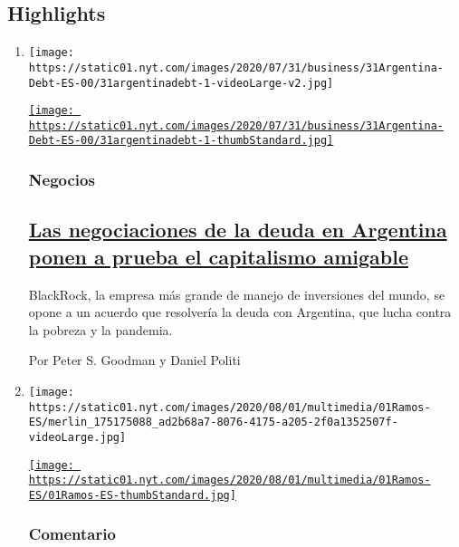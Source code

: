 \hypertarget{highlights}{%
\subsection{Highlights}\label{highlights}}

\begin{enumerate}
\def\labelenumi{\arabic{enumi}.}
\item
  \texttt{[image: https://static01.nyt.com/images/2020/07/31/business/31Argentina-Debt-ES-00/31argentinadebt-1-videoLarge-v2.jpg]}

  \href{/es/2020/07/31/espanol/negocios/argentina-deuda.html}{\texttt{[image: https://static01.nyt.com/images/2020/07/31/business/31Argentina-Debt-ES-00/31argentinadebt-1-thumbStandard.jpg]}}

  \hypertarget{negocios}{%
  \subsubsection{Negocios}\label{negocios}}

  \hypertarget{las-negociaciones-de-la-deuda-en-argentina-ponen-a-prueba-el-capitalismo-amigable}{%
  \subsection{\texorpdfstring{\href{/es/2020/07/31/espanol/negocios/argentina-deuda.html}{Las
  negociaciones de la deuda en Argentina ponen a prueba el capitalismo
  amigable}}{Las negociaciones de la deuda en Argentina ponen a prueba el capitalismo amigable}}\label{las-negociaciones-de-la-deuda-en-argentina-ponen-a-prueba-el-capitalismo-amigable}}

  BlackRock, la empresa más grande de manejo de inversiones del mundo,
  se opone a un acuerdo que resolvería la deuda con Argentina, que lucha
  contra la pobreza y la pandemia.

  Por Peter S. Goodman y Daniel Politi
\item
  \texttt{[image: https://static01.nyt.com/images/2020/08/01/multimedia/01Ramos-ES/merlin\_175175088\_ad2b68a7-8076-4175-a205-2f0a1352507f-videoLarge.jpg]}

  \href{/es/2020/08/01/espanol/opinion/trump-autoritarismo.html}{\texttt{[image: https://static01.nyt.com/images/2020/08/01/multimedia/01Ramos-ES/01Ramos-ES-thumbStandard.jpg]}}

  \hypertarget{comentario}{%
  \subsubsection{Comentario}\label{comentario}}


\end{enumerate}
